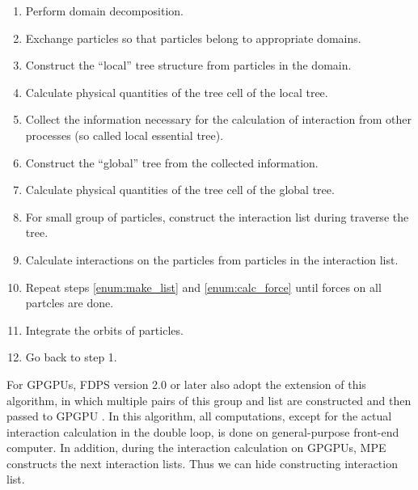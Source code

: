 \documentclass[oribibl]{llncs}
\begin{document}
\begin{enumerate}

\item Perform domain decomposition.
  
\item Exchange particles so that particles belong to appropriate
  domains.
  
\item Construct the ``local'' tree structure from particles in the
  domain.

\item Calculate physical quantities of the tree cell of the local tree.

\item Collect the information necessary for the calculation of
  interaction from other processes (so called local essential tree).
  
\item Construct the ``global'' tree from the collected information.

\item Calculate physical quantities of the tree cell of the global tree.

\item For small group of particles, construct the interaction list
  during traverse the tree. \label{enum:make_list}
  
\item Calculate interactions on the particles from particles in the
  interaction list. \label{enum:calc_force}

\item Repeat steps \ref{enum:make_list} and \ref{enum:calc_force}
  until forces on all partcles are done.
  
\item Integrate the orbits of particles.

\item Go back to step 1.
  
\end{enumerate}

For GPGPUs, FDPS version 2.0 or later also adopt the extension of this
algorithm, in which multiple pairs of this group and list are
constructed and then passed to GPGPU \cite{Hamadaetal2009}. In this
algorithm, all computations, except for the actual interaction
calculation in the double loop, is done on general-purpose front-end
computer. In addition, during the interaction calculation on GPGPUs,
MPE constructs the next interaction lists. Thus we can hide
constructing interaction list.
\end{document}
